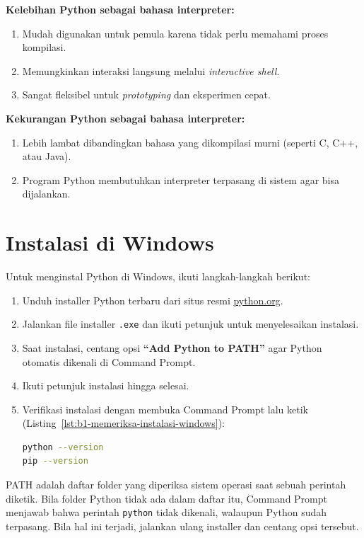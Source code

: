 \noindent
\textbf{Kelebihan Python sebagai bahasa interpreter:}
\begin{enumerate}
	\item Mudah digunakan untuk pemula karena tidak perlu memahami proses kompilasi.
	\item Memungkinkan interaksi langsung melalui \textit{interactive shell}.
	\item Sangat fleksibel untuk \textit{prototyping} dan eksperimen cepat.
\end{enumerate}

\noindent
\textbf{Kekurangan Python sebagai bahasa interpreter:}
\begin{enumerate}
	\item Lebih lambat dibandingkan bahasa yang dikompilasi murni (seperti C, C++, atau Java).
	\item Program Python membutuhkan interpreter terpasang di sistem agar bisa dijalankan.
\end{enumerate}

\section{Instalasi di Windows}
Untuk menginstal Python di Windows, ikuti langkah-langkah berikut:

\begin{enumerate}
\item Unduh installer Python terbaru dari situs resmi \href{https://www.python.org/downloads/}{python.org}.
\item Jalankan file installer \texttt{.exe} dan ikuti petunjuk untuk menyelesaikan instalasi.
\item Saat instalasi, centang opsi \textbf{``Add Python to PATH''} agar Python otomatis dikenali di Command Prompt.
\item Ikuti petunjuk instalasi hingga selesai.
\item Verifikasi instalasi dengan membuka Command Prompt lalu ketik (Listing~\ref{lst:b1-memeriksa-instalasi-windows}):
\begin{lstlisting}[language=bash, caption={Memeriksa instalasi Python di Windows}, label={lst:b1-memeriksa-instalasi-windows}]
python --version
pip --version
\end{lstlisting}
\end{enumerate}

PATH adalah daftar folder yang diperiksa sistem operasi saat sebuah perintah diketik. Bila folder Python tidak ada dalam daftar itu, Command Prompt menjawab bahwa perintah \texttt{python} tidak dikenali, walaupun Python sudah terpasang. Bila hal ini terjadi, jalankan ulang installer dan centang opsi tersebut.


